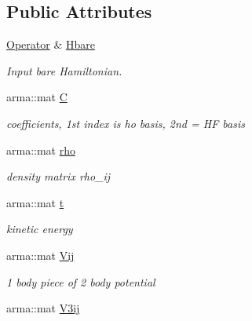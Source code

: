 \subsection*{Public Attributes}
\begin{DoxyCompactItemize}
\item 
\hypertarget{classHartreeFock_aad1a5eeadedf9689bbfc2e3d71b60aee}{\hyperlink{classOperator}{Operator} \& \hyperlink{classHartreeFock_aad1a5eeadedf9689bbfc2e3d71b60aee}{Hbare}}\label{classHartreeFock_aad1a5eeadedf9689bbfc2e3d71b60aee}

\begin{DoxyCompactList}\small\item\em Input bare Hamiltonian. \end{DoxyCompactList}\item 
\hypertarget{classHartreeFock_a9c73247cdb9255cebabaacc99ec55086}{arma\-::mat \hyperlink{classHartreeFock_a9c73247cdb9255cebabaacc99ec55086}{C}}\label{classHartreeFock_a9c73247cdb9255cebabaacc99ec55086}

\begin{DoxyCompactList}\small\item\em coefficients, 1st index is ho basis, 2nd = H\-F basis \end{DoxyCompactList}\item 
\hypertarget{classHartreeFock_a6fc0aa9f25640979d5188443a19aeea5}{arma\-::mat \hyperlink{classHartreeFock_a6fc0aa9f25640979d5188443a19aeea5}{rho}}\label{classHartreeFock_a6fc0aa9f25640979d5188443a19aeea5}

\begin{DoxyCompactList}\small\item\em density matrix rho\-\_\-ij \end{DoxyCompactList}\item 
\hypertarget{classHartreeFock_ac0574a970910f77d873a8f2b9beb8441}{arma\-::mat \hyperlink{classHartreeFock_ac0574a970910f77d873a8f2b9beb8441}{t}}\label{classHartreeFock_ac0574a970910f77d873a8f2b9beb8441}

\begin{DoxyCompactList}\small\item\em kinetic energy \end{DoxyCompactList}\item 
\hypertarget{classHartreeFock_ae823da58505b21231d092b3ef7cec3bf}{arma\-::mat \hyperlink{classHartreeFock_ae823da58505b21231d092b3ef7cec3bf}{Vij}}\label{classHartreeFock_ae823da58505b21231d092b3ef7cec3bf}

\begin{DoxyCompactList}\small\item\em 1 body piece of 2 body potential \end{DoxyCompactList}\item 
\hypertarget{classHartreeFock_a25a0f38a655064375765f74182ce9334}{arma\-::mat \hyperlink{classHartreeFock_a25a0f38a655064375765f74182ce9334}{V3ij}}\label{classHartreeFock_a25a0f38a655064375765f74182ce9334}


\end{DoxyCompactItemize}
